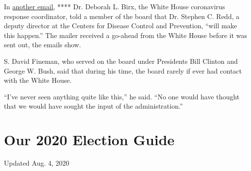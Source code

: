 In
\href{https://www.documentcloud.org/documents/7010863-USPS-Emails-Show-Trump-Coronavirus-Postcard-Was.html}{another
email}, **** Dr. Deborah L. Birx, the White House coronavirus response
coordinator, told a member of the board that Dr. Stephen C. Redd, a
deputy director at the Centers for Disease Control and Prevention,
``will make this happen.'' The mailer received a go-ahead from the White
House before it was sent out, the emails show.

S. David Fineman, who served on the board under Presidents Bill Clinton
and George W. Bush, said that during his time, the board rarely if ever
had contact with the White House.

``I've never seen anything quite like this,'' he said. ``No one would
have thought that we would have sought the input of the
administration.''

\hypertarget{our-2020-election-guide}{%
\section{Our 2020 Election Guide}\label{our-2020-election-guide}}

Updated Aug. 4, 2020

